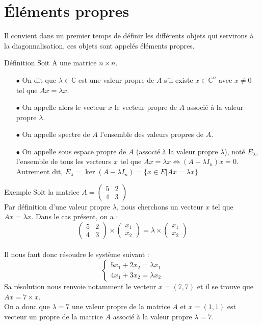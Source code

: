 \section{Éléments propres}
Il convient dans un premier temps de définir les différents objets qui servirons à la diagonnalisation, ces objets sont appelés éléments propres.
\begin{bclogo}[couleur=blue!30,couleurBord=blue,arrondi=0.1,logo=\bcbook,ombre=true]{Définition}
Soit A une matrice $n\times n$.
\begin{itemize}
    \item[$\bullet$] On dit que $\lambda\in\mathbb{C}$ est une valeur propre de $A$ s'il existe $x\in\mathbb{C}^{n}$ avec $x\neq 0$ tel que $Ax = \lambda x$.
    \item[$\bullet$] On appelle alors le vecteur $x$ le vecteur propre de $A$ associé à la valeur propre $\lambda$.
    \item[$\bullet$] On appelle spectre de $A$ l'ensemble des valeurs propres de $A$.
    \item[$\bullet$] On appelle sous espace propre de $A$ (associé à la valeur propre $\lambda$), noté $E_{\lambda}$, l'ensemble de tous les vecteurs $x$ tel que
$Ax=\lambda x \Leftrightarrow (A-\lambda I_n)x=0$.\\
Autrement dit, $E_{\lambda}=\ker(A-\lambda I_n)=\{x\in E | Ax=\lambda x\}$\\
\end{itemize}
\end{bclogo}
\begin{bclogo}[logo=\bccrayon,noborder=true,barre=snake]{Exemple}
Soit la matrice $A=\begin{pmatrix}
5 & 2 \\
4 & 3
\end{pmatrix}$\\
Par définition d'une valeur propre $\lambda$, nous cherchons un vecteur $x$ tel que $Ax=\lambda x$.
Dans le cas présent, on a :\\
$$\begin{pmatrix} 5 & 2\\ 4 & 3\end{pmatrix}\times\begin{pmatrix}x_1\\x_2\end{pmatrix}=\lambda\times\begin{pmatrix}x_1\\x_2\end{pmatrix}$$\\
Il nous faut donc résoudre le système suivant :\\
$$\begin{cases}5x_1+2x_2=\lambda x_1\\4x_1 + 3x_2=\lambda x_2\end{cases}$$
Sa résolution nous renvoie notamment le vecteur $x=(7,7)$ et il se trouve que $Ax=7\times x$.\\
On a donc que $\lambda = 7$ une valeur propre de la matrice $A$ et $x=(1,1)$ est vecteur un propre de la matrice $A$ associé à la valeur propre $\lambda = 7$.\\
\\
\end{bclogo}
